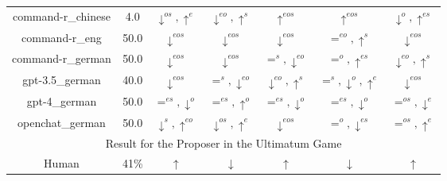 \documentclass{article}
\begin{document}
\begin{table}
\begin{tabular}{ccccccc}
command-r\_chinese & 4.0 & $\downarrow^{os},\uparrow^{e}$ & $\downarrow^{eo},\uparrow^{s}$ & $\uparrow^{eos}$ & $\uparrow^{eos}$ & $\downarrow^{o},\uparrow^{es}$ \\
command-r\_eng & 50.0 & $\downarrow^{eos}$ & $\downarrow^{eos}$ & $\downarrow^{eos}$ & $=^{eo},\uparrow^{s}$ & $\downarrow^{eos}$ \\
command-r\_german & 50.0 & $\downarrow^{eos}$ & $\downarrow^{eos}$ & $=^{s},\downarrow^{eo}$ & $=^{o},\uparrow^{es}$ & $\downarrow^{eo},\uparrow^{s}$ \\
gpt-3.5\_german & 40.0 & $\downarrow^{eos}$ & $=^{s},\downarrow^{eo}$ & $\downarrow^{eo},\uparrow^{s}$ & $=^{s},\downarrow^{o},\uparrow^{e}$ & $\downarrow^{eos}$ \\
gpt-4\_german & 50.0 & $=^{es},\downarrow^{o}$ & $=^{es},\uparrow^{o}$ & $=^{es},\downarrow^{o}$ & $=^{es},\downarrow^{o}$ & $=^{os},\downarrow^{e}$ \\
openchat\_german & 50.0 & $\downarrow^{s},\uparrow^{eo}$ & $\downarrow^{os},\uparrow^{e}$ & $\downarrow^{eos}$ & $=^{o},\downarrow^{es}$ & $=^{os},\uparrow^{e}$ \\

         \hline        
         \multicolumn{7}{c}{Result for the Proposer in the Ultimatum Game} \\

Human       & 41\%  & $\uparrow$ & $\downarrow$ & $\uparrow$ & $\downarrow$ & $\uparrow$ \\


\end{tabular}
\end{table}
\end{document}
